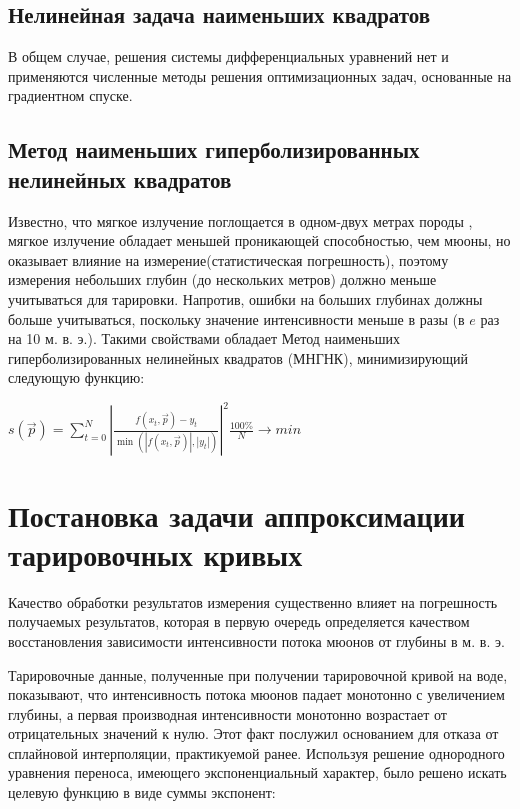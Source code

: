 \subsection{Нелинейная задача наименьших квадратов}


В общем случае, решения системы дифференциальных уравнений нет и 
применяются численные методы решения оптимизационных задач, 
основанные на градиентном спуске.

\subsection[Метод наименьших гиперболизированных нелинейных  квадратов]{Метод наименьших гиперболизированных \\ нелинейных  квадратов}
Известно, что  мягкое излучение поглощается в одном-двух метрах породы \cite{cosmicrays}, мягкое излучение обладает
меньшей проникающей способностью, чем мюоны, но оказывает влияние на измерение(статистическая погрешность),
поэтому измерения небольших глубин (до нескольких метров) должно меньше учитываться для тарировки. 
Напротив, ошибки на больших глубинах должны больше учитываться, поскольку значение интенсивности  меньше в разы
(в $e$ раз на 10 м. в. э.). Такими свойствами обладает Метод наименьших гиперболизированных нелинейных  квадратов (МНГНК), минимизирующий следующую функцию: 

\begin{center}
$s(\vec{p}) = \displaystyle\sum_{t=0}^N \left|
\frac{f(x_t, \vec{p}) - y_t}{\min(\left|f(x_t, \vec{p})\right|, \left|y_t\right|)}\right|^2 
\frac{100\%}{N} \rightarrow min$ %
 
\end{center}


\section{Постановка задачи аппроксимации тарировочных кривых}\label{sect2_2}

Качество обработки результатов измерения существенно влияет на погрешность
получаемых результатов, которая в первую очередь определяется
качеством восстановления зависимости интенсивности потока мюонов от глубины в м. в. э.

Тарировочные данные, полученные при получении тарировочной кривой на воде, 
показывают, что интенсивность потока мюонов падает монотонно с увеличением
глубины, а первая производная интенсивности монотонно возрастает 
от отрицательных значений к нулю. Этот факт послужил основанием для отказа 
от сплайновой интерполяции, практикуемой ранее. Используя решение 
однородного уравнения переноса, имеющего экспоненциальный характер, было решено
искать целевую функцию в виде суммы экспонент:

